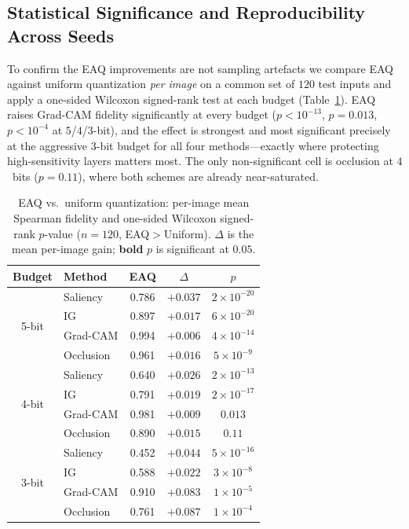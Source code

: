 \subsection{Statistical Significance and Reproducibility Across Seeds}
\label{sec:significance}
To confirm the EAQ improvements are not sampling artefacts we compare EAQ against
uniform quantization \emph{per image} on a common set of $120$ test inputs and
apply a one-sided Wilcoxon signed-rank test at each budget
(Table~\ref{tab:signif}). EAQ raises Grad-CAM fidelity significantly at every
budget ($p<10^{-13}$, $p=0.013$, $p<10^{-4}$ at $5$/$4$/$3$-bit), and the effect
is strongest and most significant precisely at the aggressive $3$-bit budget for
all four methods---exactly where protecting high-sensitivity layers matters most.
The only non-significant cell is occlusion at $4$~bits ($p=0.11$), where both
schemes are already near-saturated.

\begin{table}[!t]
\caption{EAQ vs.\ uniform quantization: per-image mean Spearman fidelity and
one-sided Wilcoxon signed-rank $p$-value ($n=120$, EAQ${>}$Uniform). $\Delta$ is
the mean per-image gain; \textbf{bold} $p$ is significant at $0.05$.}
\label{tab:signif}
\centering
\footnotesize
\begin{tabular}{c l c c c}
\hline
\textbf{Budget} & \textbf{Method} & \textbf{EAQ} & \textbf{$\Delta$} &
\textbf{$p$}\\
\hline
\multirow{4}{*}{5-bit} & Saliency & 0.786 & $+0.037$ & \textbf{$2{\times}10^{-20}$}\\
 & IG & 0.897 & $+0.017$ & \textbf{$6{\times}10^{-20}$}\\
 & Grad-CAM & 0.994 & $+0.006$ & \textbf{$4{\times}10^{-14}$}\\
 & Occlusion & 0.961 & $+0.016$ & \textbf{$5{\times}10^{-9}$}\\
\hline
\multirow{4}{*}{4-bit} & Saliency & 0.640 & $+0.026$ & \textbf{$2{\times}10^{-13}$}\\
 & IG & 0.791 & $+0.019$ & \textbf{$2{\times}10^{-17}$}\\
 & Grad-CAM & 0.981 & $+0.009$ & \textbf{$0.013$}\\
 & Occlusion & 0.890 & $+0.015$ & $0.11$\\
\hline
\multirow{4}{*}{3-bit} & Saliency & 0.452 & $+0.044$ & \textbf{$5{\times}10^{-16}$}\\
 & IG & 0.588 & $+0.022$ & \textbf{$3{\times}10^{-8}$}\\
 & Grad-CAM & 0.910 & $+0.083$ & \textbf{$1{\times}10^{-5}$}\\
 & Occlusion & 0.761 & $+0.087$ & \textbf{$1{\times}10^{-4}$}\\
\hline
\end{tabular}
\end{table}

